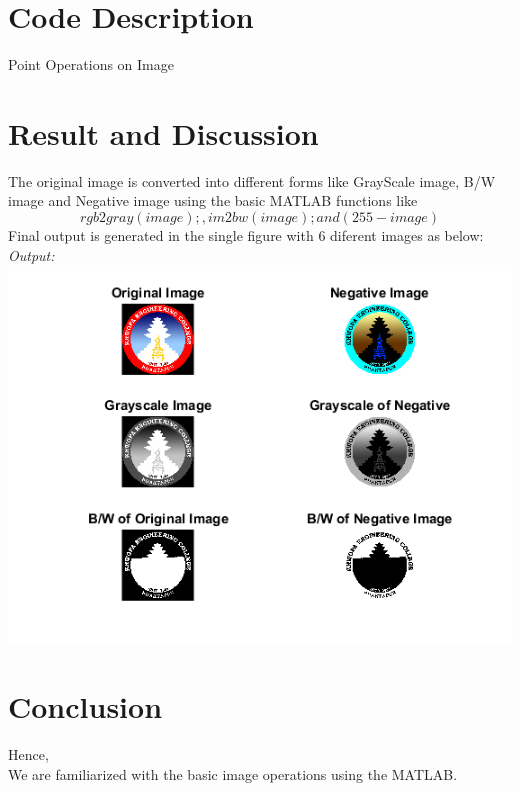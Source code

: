 \documentclass[12pt]{article}
\begin{document}
\section{Code Description}
Point Operations on Image \\






\pagebreak

\section{Result and Discussion}
The original image is converted into different forms like GrayScale image, B/W image and Negative image using the basic MATLAB functions like$$  rgb2gray(image); , im2bw(image); and (255 - image) $$
Final output is generated in the single figure with 6 diferent images as below:\\

\emph{Output:}\\

\includegraphics[scale =1.0]{output_labtwo_1.png}







\pagebreak

\section{Conclusion}
Hence, \\
We are familiarized with the  basic image operations using the MATLAB.
\newpage
%
%
\end{document}
